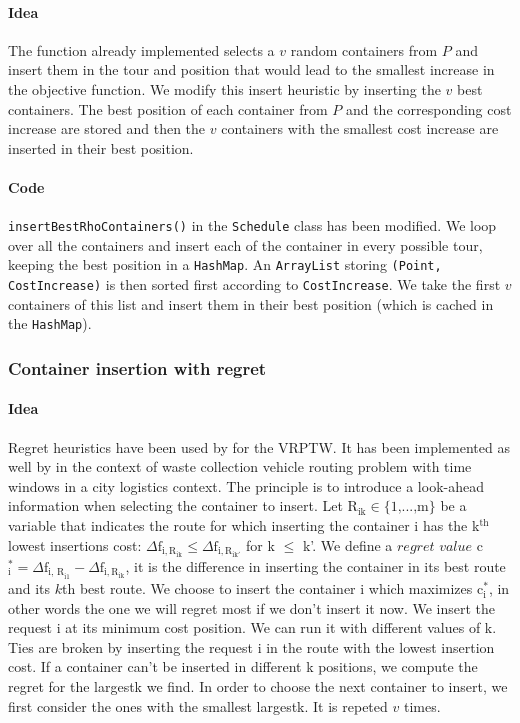 \documentclass[12pt,a4paper]{article}
\begin{document}
\paragraph{Idea}The function already implemented selects a $v$ random containers from $P$ and insert them in the tour and position that would lead to the smallest increase in the objective function. We modify this insert heuristic by inserting the $v$ best containers. The best position of each container from $P$ and the corresponding cost increase are stored and then the $v$ containers with the smallest cost increase are inserted in their best position.
\paragraph{Code}\texttt{insertBestRhoContainers()} in the \texttt{Schedule} class has been modified. We loop over all the containers and insert each of the container in every possible tour, keeping the best position in a \texttt{HashMap}. An \texttt{ArrayList} storing \texttt{(Point, CostIncrease)} is then sorted first according to \texttt{CostIncrease}. We take the first $v$ containers of this list and insert them in their best position (which is cached in the \texttt{HashMap}).
\subsubsection{Container insertion with regret} 
\paragraph{Idea}Regret heuristics have been used by \cite{Potvin1993} for the VRPTW. It has been implemented as well by \cite{Buhrkal2012} in the context of waste collection vehicle routing problem with time windows in a city logistics context. The principle is to introduce a look-ahead information when selecting the container to insert. Let R$_{\text{ik}} \in \{\text{1,...,m}\}$ be a variable that indicates the route for which inserting the container i has the k$^{\text{th}}$ lowest insertions cost: $\Delta \text{f}_{\text{i}, \text{R}_{\text{ik}}} \leq \Delta \text{f}_{\text{i}, \text{R}_{\text{ik}'}}$ for k $\leq$ k'. We define a $regret$ $value$ c$_{\text{i}}^{*} = \Delta \text{f}_{\text{i, R}_{\text{i1}}}- \Delta \text{f}_{\text{i}, \text{R}_{\text{ik}}}$, it is the difference in inserting the container in its best route and its $k$th best route. We choose to insert the container i which maximizes c$_{\text{i}}^{*}$, in other words the one we will regret most if we don't insert it now. We insert the request i at its minimum cost position. We can run it with different values of k. Ties are broken by inserting the request i in the route with the lowest insertion cost. If a container can't be inserted in different k positions, we compute the regret for the largest\textunderscore k we find. In order to choose the next container to insert, we first consider the ones with the smallest largest\textunderscore k. It is repeted $v$ times. 
\end{document}
